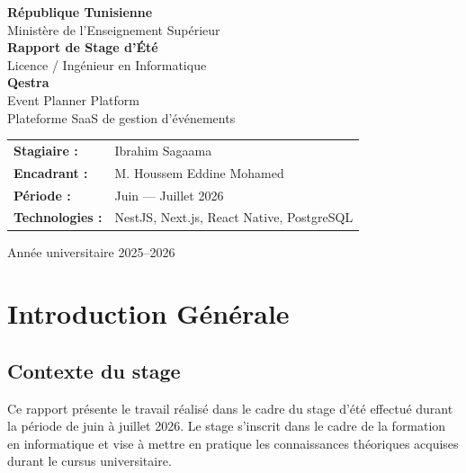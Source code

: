\documentclass[12pt,a4paper]{report}
\begin{document}
\begin{titlepage}
\centering
\vspace*{2cm}

{\Large\textbf{République Tunisienne}}\\[0.3cm]
{\large Ministère de l'Enseignement Supérieur}\\[1.5cm]

{\large\textbf{Rapport de Stage d'Été}}\\[0.5cm]
{\large Licence / Ingénieur en Informatique}\\[2cm]

{\Huge\bfseries\color{primary} Qestra}\\[0.5cm]
{\LARGE Event Planner Platform}\\[0.3cm]
{\large Plateforme SaaS de gestion d'événements}\\[3cm]

\begin{tabular}{ll}
\textbf{Stagiaire :} & Ibrahim Sagaama \\[0.3cm]
\textbf{Encadrant :} & M. Houssem Eddine Mohamed \\[0.3cm]
\textbf{Période :} & Juin — Juillet 2026 \\[0.3cm]
\textbf{Technologies :} & NestJS, Next.js, React Native, PostgreSQL \\
\end{tabular}

\vfill
{\large Année universitaire 2025–2026}
\end{titlepage}

\tableofcontents
\newpage

\chapter{Introduction Générale}

\section{Contexte du stage}
Ce rapport présente le travail réalisé dans le cadre du stage d'été effectué durant la période de juin à juillet 2026. Le stage s'inscrit dans le cadre de la formation en informatique et vise à mettre en pratique les connaissances théoriques acquises durant le cursus universitaire.
\end{document}
